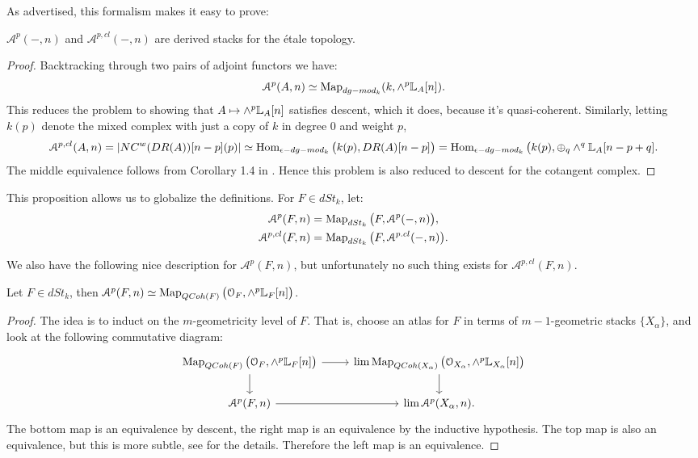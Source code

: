 As advertised, this formalism makes it easy to prove:
\begin{prop}
\label{prop:forms_descent}
$\mathcal{A}^p(-,n)$ and $\mathcal{A}^{p,cl}(-,n)$ are derived stacks for the \'etale topology.
\end{prop}
\begin{proof}
Backtracking through two pairs of adjoint functors we have:
\[	\mathcal{A}^p(A,n) \simeq \operatorname{Map}_{dg-mod_k}(k, \wedge^p\mathbb L_A[n]).	\]
This reduces the problem to showing that $A \mapsto \wedge^p\mathbb L_A[n]$ satisfies descent, which it does, because it's
quasi-coherent. Similarly, letting $k(p)$ denote the mixed complex with just a copy of $k$ in degree 0 and weight $p$,
\[	\mathcal{A}^{p,cl}(A,n) = |NC^w(DR(A))[n-p](p)| \simeq \operatorname{Hom}_{\epsilon-dg-mod_k}\big(k(p),DR(A)[n-p]\big)
= \operatorname{Hom}_{\epsilon-dg-mod_k} \big(k(p), \oplus_q \wedge^q \mathbb L_A[n-p+q].	\]
The middle equivalence follows from Corollary 1.4 in \cite{PTVV}. Hence this problem is also reduced to descent for the
cotangent complex.
\end{proof}

This proposition allows us to globalize the definitions. For $F\in dSt_k$, let:
\begin{align*}
\mathcal{A}^p(F,n) &= \operatorname{Map}_{dSt_k}\big(F,\mathcal{A}^p(-,n)\big), \\
\mathcal{A}^{p,cl}(F,n) &= \operatorname{Map}_{dSt_k}\big(F,\mathcal{A}^{p.cl}(-,n)\big).
\end{align*}

We also have the following nice description for $\mathcal{A}^p(F,n)$, but unfortunately no such thing exists for
$\mathcal{A}^{p,cl}(F,n)$.

\begin{prop}
\label{prop:forms_maps}
Let $F \in dSt_k$, then $\mathcal{A}^p(F,n) \simeq \operatorname{Map}_{QCoh(F)}\big(\mathcal{O}_F,\wedge^p\mathbb L_F[n]\big)$.
\end{prop}
\begin{proof}
The idea is to induct on the $m$-geometricity level of $F$. That is, choose an atlas for $F$ in terms of $m-1$-geometric
stacks $\{X_{\alpha}\}$, and look at the following commutative diagram:
\[
\begin{tikzcd}
\Map_{QCoh(F)}\big(\mathcal{O}_F,\wedge^p\bbL_F[n]\big) \arrow{d}\arrow{r} &
\lim \Map_{QCoh(X_{\alpha})}\big(\mathcal{O}_{X_{\alpha}},\wedge^p\bbL_{X_{\alpha}}[n]\big)\arrow{d} \\
\mathcal{A}^p(F,n) \arrow{r} & \lim \mathcal{A}^p(X_{\alpha},n) .
\end{tikzcd}
\]
The bottom map is an equivalence by descent, the right map is an equivalence by the inductive hypothesis. The top map
is also an equivalence, but this is more subtle, see \cite{PTVV} for the details. Therefore the left map is an equivalence.
\end{proof}

